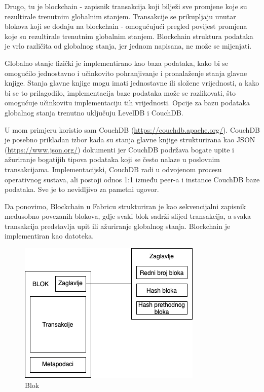 \documentclass[times, utf8, diplomski]{fer}
\begin{document}
Drugo, tu je blockchain - zapisnik transakcija koji bilježi sve promjene koje su rezultirale trenutnim globalnim stanjem. Transakcije se prikupljaju unutar blokova koji se dodaju na blockchain - omogućujući pregled povijest promjena koje su rezultirale trenutnim globalnim stanjem. Blockchain struktura podataka je vrlo različita od globalnog stanja, jer jednom napisana, ne može se mijenjati.

Globalno stanje fizički je implementirano kao baza podataka, kako bi se omogućilo jednostavno i učinkovito pohranjivanje i pronalaženje stanja glavne knjige. Stanja glavne knjige mogu imati jednostavne ili složene vrijednosti, a kako bi se to prilagodilo, implementacija baze podataka može se razlikovati,  što omogućuje učinkovitu implementaciju tih vrijednosti. Opcije za bazu podataka globalnog stanja trenutno uključuju LevelDB i CouchDB.

U mom primjeru koristio sam CouchDB (\url{https://couchdb.apache.org/}).  CouchDB je posebno prikladan izbor kada su stanja glavne knjige strukturirana kao JSON (\url{https://www.json.org/}) dokumenti jer CouchDB podržava bogate upite i ažuriranje bogatijih tipova podataka koji se često nalaze u poslovnim transakcijama.  Implementacijski,  CouchDB radi u odvojenom procesu operativnog sustava, ali postoji odnos 1:1 između peer-a i instance CouchDB baze podataka. Sve je to nevidljivo za pametni ugovor.

Da ponovimo, Blockchain u Fabricu strukturiran je kao sekvencijalni zapisnik međusobno povezanih blokova, gdje svaki blok sadrži slijed transakcija, a svaka transakcija predstavlja upit ili ažuriranje globalnog stanja.  Blockchain je implementiran kao datoteka. 

\begin{figure}[htb]
\centering
\includegraphics[scale=0.5]{imgs/Block.png}
\caption{Blok}
\label{fig:blok}
\end{figure}
\end{document}
